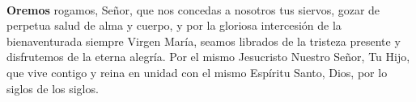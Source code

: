 \\[2mm]
\textbf{Oremos}
 rogamos, Señor, que nos concedas a nosotros tus siervos, gozar de perpetua salud de alma y cuerpo, y por la gloriosa intercesión de la bienaventurada siempre Virgen
María, seamos librados de la tristeza presente y disfrutemos de la eterna alegría. Por el mismo Jesucristo Nuestro Señor, Tu Hijo, que vive contigo y reina en unidad con el mismo Espíritu
Santo, Dios, por lo siglos de los siglos.